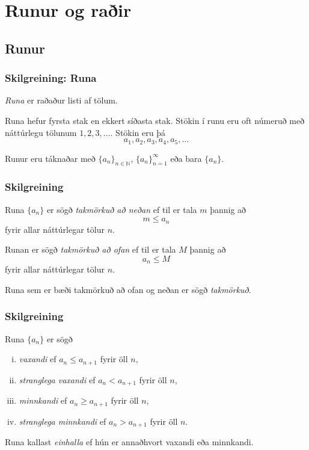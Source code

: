 \documentclass[icelandic,a4paper,12pt]{article}
\date{29. ágúst 2015}
\newcommand{\N}{{\mathbb  N}}
\begin{document}
\setcounter{tocdepth}{2}
\tableofcontents

\section{Runur og raðir}

\subsection{Runur}
\subsubsection{Skilgreining: Runa}
\emph{Runa} er raðaður listi af tölum.  

Runa hefur fyrsta stak en
ekkert síðasta stak.  Stökin í runu eru oft númeruð með náttúrlegu
tölunum $1, 2, 3, \ldots$. Stökin eru þá
$$
a_1, a_2, a_3, a_4, a_5, \ldots
$$

Runur eru táknaðar með 
$\{a_n\}_{n\in {\N}}$,
$\{a_n\}_{n=1}^\infty$ eða bara  $\{a_n\}$.

\subsubsection{Skilgreining}
Runa  $\{a_n\}$ er sögð \emph{takmörkuð að neðan} ef til er tala $m$ þannig að 
$$
  m\leq a_n
$$ 
fyrir allar náttúrlegar tölur $n$.  

Runan  er sögð \emph{takmörkuð að ofan} ef til er tala $M$ þannig að 
$$
 a_n\leq M
$$ 
fyrir allar náttúrlegar tölur $n$. 
  
Runa sem er bæði takmörkuð að ofan og neðan er sögð \emph{takmörkuð}.

\subsubsection{Skilgreining}  
Runa  $\{a_n\}$ er sögð
\begin{enumerate}[(i)]
\item \emph{vaxandi} ef $a_n\leq a_{n+1}$ fyrir öll $n$,
\item \emph{stranglega vaxandi} ef $a_n< a_{n+1}$ fyrir öll $n$,
\item \emph{minnkandi} ef $a_n\geq a_{n+1}$ fyrir öll $n$,
\item \emph{stranglega minnkandi} ef $a_n> a_{n+1}$ fyrir öll $n$.
\end{enumerate}

Runa kallast \emph{einhalla} ef hún er annaðhvort vaxandi eða
minnkandi.
\end{document}
